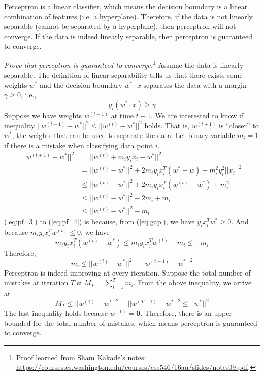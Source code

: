 \documentclass[12pt]{article}
\begin{document}
Perceptron is a linear classifier, which means the decision boundary is a linear combination of features (i.e. a hyperplane). Therefore, if the data is not linearly separable (cannot be separated by a hyperplane), then perceptron will not converge. If the data is indeed linearly separable, then perceptron is guaranteed to converge.

\emph{Prove that perceptron is guaranteed to converge.}\footnote{Proof learned from Sham Kakade's notes: \url{https://courses.cs.washington.edu/courses/cse546/16au/slides/notes09.pdf}.} Assume the data is linearly separable. The definition of linear separability tells us that there exists some weights $w^*$ and the decision boundary $w^*\cdot x$ separates the data with a margin $\gamma\geq 0$, i.e.,
\begin{equation}\label{eq:gap}
  y_i(w^*\cdot x)\geq \gamma
\end{equation}
Suppose we have weights $w^{(t+1)}$ at time $t+1$. We are interested to know if inequality $||w^{(t+1)}-w^*||^2\leq||w^{(t)}-w^*||^2$ holds. That is, $w^{(t+1)}$ is ``closer'' to $w^*$, the weights that can be used to separate the data. Let binary variable $m_i=1$ if there is a mistake when classifying data point $i$.
\begin{align}
  ||w^{(t+1)}-w^*||^2&=||w^{(t)}+m_iy_ix_i-w^*||^2\\
  &=||w^{(t)}-w^*||^2+2m_iy_ix_i^T(w^*-w)+m_i^2y_i^2||x_i||^2\\
  \label{eq:pf_3}&\leq ||w^{(t)}-w^*||^2+2m_iy_ix_i^T(w^{(t)}-w^*)+m_i^2\\
  \label{eq:pf_4}&\leq ||w^{(t)}-w^*||^2-2m_i+m_i\\
  &\leq ||w^{(t)}-w^*||^2-m_i
\end{align}
(\ref{eq:pf_3}) to (\ref{eq:pf_4}) is because, from (\ref{eq:gap}), we have $y_ix_i^Tw^*\geq 0$. And because $m_iy_ix_i^Tw^{(t)}\leq 0$, we have
\begin{equation}
  m_iy_ix_i^T(w^{(t)}-w^*)\leq m_iy_ix_i^Tw^{(t)}-m_i\leq -m_i
\end{equation}
Therefore,
\begin{equation}
  m_i\leq||w^{(t)}-w^*||^2-||w^{(t+1)}-w^*||^2
\end{equation}
Perceptron is indeed improving at every iteration. Suppose the total number of mistakes at iteration $T$ si $M_T=\sum_{i=1}^Tm_i$. From the above inequality, we arrive at
\begin{equation}
  M_T\leq||w^{(1)}-w^*||^2-||w^{(T+1)}-w^*||^2\leq ||w^*||^2
\end{equation}
The last inequality holds because $w^{(1)}=\bm{0}$. Therefore, there is an upper-bounded for the total number of mistakes, which means perceptron is guaranteed to converge.
\end{document}
